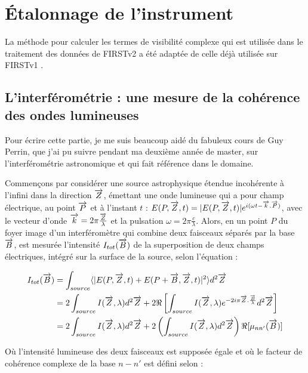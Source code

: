 \section{Étalonnage de l'instrument}

La méthode pour calculer les termes de visibilité complexe qui est utilisée dans le traitement des données de \ac{FIRSTv2} a été adaptée de celle déjà utilisée sur \ac{FIRSTv1} \citep{huby2012, huby2013these, vievard2022}.

\subsection{L'interférométrie : une mesure de la cohérence des ondes lumineuses}

Pour écrire cette partie, je me suis beaucoup aidé du fabuleux cours de Guy Perrin, que j'ai pu suivre pendant ma deuxième année de master, sur l'interférométrie astronomique et qui fait référence dans le domaine.

Commençons par considérer une source astrophysique étendue incohérente à l'infini dans la direction $\overrightarrow{Z}$, émettant une onde lumineuse qui a pour champ électrique, au point $\overrightarrow{P}$ et à l'instant $t$ : $E(P,\overrightarrow{Z},t) = |E(P,\overrightarrow{Z},t)| e^{i(\omega t - \overrightarrow{k}.\overrightarrow{P})}$, avec le vecteur d'onde $\overrightarrow{k} = 2\pi \frac{\overrightarrow{Z}}{\lambda}$ et la pulsation $\omega = 2\pi \frac{c}{\lambda}$. Alors, en un point $P$ du foyer image d'un interféromètre qui combine deux faisceaux séparés par la base $\overrightarrow{B}$, est mesurée l'intensité $I_{tot}(\overrightarrow{B})$ de la superposition de deux champs électriques, intégré sur la surface de la source, selon l'équation :

\begin{align}
	I_{tot}(\overrightarrow{B}) &= \int_{source} \langle | E(P,\overrightarrow{Z},t) + E(P+\overrightarrow{B},\overrightarrow{Z},t) |^2 \rangle d^2\overrightarrow{Z} \label{eq:Interferogramme1} \\
	&= 2 \int_{source} I(\overrightarrow{Z},\lambda) d^2\overrightarrow{Z} + 2 \Re \left[\int_{source} I(\overrightarrow{Z},\lambda) e^{-2i\pi \overrightarrow{Z}.\frac{\overrightarrow{B}}{\lambda}} d^2\overrightarrow{Z} \right] \\
	&= 2 \int_{source} I(\overrightarrow{Z},\lambda) d^2\overrightarrow{Z} + 2 \left(\int_{source} I(\overrightarrow{Z},\lambda) d^2\overrightarrow{Z} \right) \Re [\mu_{nn'}(\overrightarrow{B})] \label{eq:Interferogramme3}
\end{align}

Où l'intensité lumineuse des deux faisceaux est supposée égale et où le facteur de cohérence complexe de la base $n-n'$ est défini selon :

